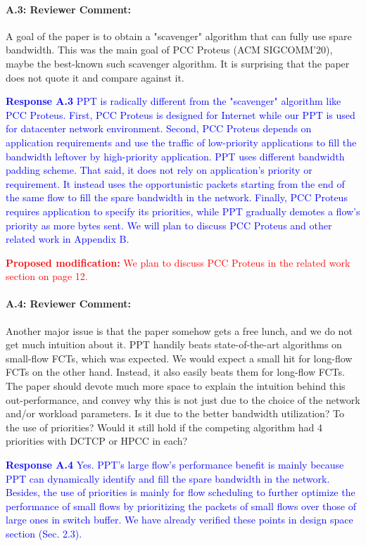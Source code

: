 \documentclass[12pt,one-column]{article}
\begin{document}
{\it \paragraph{A.3: Reviewer Comment:} A goal of the paper is to obtain a "scavenger" algorithm that can fully use spare bandwidth. This was the main goal of PCC Proteus (ACM SIGCOMM'20), maybe the best-known such scavenger algorithm. It is surprising that the paper does not quote it and compare against it.}

\noindent\textcolor{blue}{\textbf{Response A.3}
PPT is radically different from the "scavenger" algorithm like PCC Proteus.
First, PCC Proteus is designed for Internet while our PPT is used for datacenter network environment.
Second, PCC Proteus depends on application requirements and use the traffic of low-priority applications to fill the bandwidth leftover by high-priority application. PPT uses different bandwidth padding scheme. That said, it does not rely on application's priority or requirement. It instead uses the opportunistic packets starting from the end of the same flow to fill the spare bandwidth in the network.
Finally, PCC Proteus requires application to specify its priorities, while PPT gradually demotes a flow's priority as more bytes sent. We will plan to discuss PCC Proteus and other related work in Appendix B.
} 

\noindent\textcolor{red}{\textbf{Proposed modification: }
We plan to discuss PCC Proteus in the related work section on page 12.
}

{\it \paragraph{A.4: Reviewer Comment:}Another major issue is that the paper somehow gets a free lunch, and we do not get much intuition about it. PPT handily beats state-of-the-art algorithms on small-flow FCTs, which was expected. We would expect a small hit for long-flow FCTs on the other hand. Instead, it also easily beats them for long-flow FCTs. The paper should devote much more space to explain the intuition behind this out-performance, and convey why this is not just due to the choice of the network and/or workload parameters. Is it due to the better bandwidth utilization? To the use of priorities? Would it still hold if the competing algorithm had 4 priorities with DCTCP or HPCC in each?}

\noindent\textcolor{blue}{\textbf{Response A.4}
Yes. PPT's large flow's performance benefit is mainly because PPT can dynamically identify and fill the spare bandwidth in the network.
Besides, the use of priorities is mainly for flow scheduling to further optimize the performance of small flows by prioritizing the packets of small flows over those of large ones in switch buffer. 
We have already verified these points in design space section (Sec. 2.3).}
\end{document}
